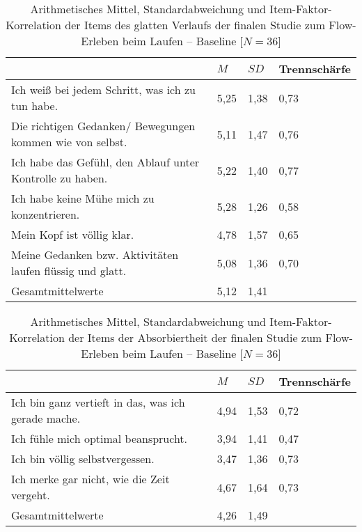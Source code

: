 \begin{table}[ht]
\centering
	\caption[Item-Faktor-Korrelation der Items des glatten Verlaufs -- Baseline (Studie: Laufen)]{Arithmetisches Mittel, Standardabweichung und Item-Faktor-Korrelation der Items des glatten Verlaufs der finalen Studie zum Flow-Erleben beim Laufen -- Baseline [$N = 36$]}
	\label{tab:glatter_verlauf_studie_laufen_baseline}
	\begin{tabularx}{\textwidth}{p{} p{} p{} p{}}
\toprule
& $M$ & $SD$ & Trennschärfe \\
\midrule
Ich weiß bei jedem Schritt, was ich zu tun habe. & 5,25 & 1,38 & 0,73 \\
Die richtigen Gedanken/ Bewegungen kommen wie von selbst. & 5,11 & 1,47 & 0,76 \\
Ich habe das Gefühl, den Ablauf unter Kontrolle zu haben. & 5,22 & 1,40 & 0,77 \\
Ich habe keine Mühe mich zu konzentrieren. & 5,28 & 1,26 & 0,58 \\
Mein Kopf ist völlig klar. & 4,78 & 1,57 & 0,65 \\
Meine Gedanken bzw. Aktivitäten laufen flüssig und glatt. & 5,08 & 1,36 & 0,70 \\
Gesamtmittelwerte & 5,12 & 1,41 & \\
\bottomrule
\end{tabularx}
\end{table}

\begin{table}[ht]
\centering
	\caption[Item-Faktor-Korrelation der Items der Absorbiertheit -- Baseline (Studie: Laufen)]{Arithmetisches Mittel, Standardabweichung und Item-Faktor-Korrelation der Items der Absorbiertheit der finalen Studie zum Flow-Erleben beim Laufen -- Baseline [$N = 36$]}
	\label{tab:absorbiertheit_studie_laufen_baseline}
	\begin{tabularx}{\textwidth}{p{} p{} p{} p{}}
\toprule
& $M$ & $SD$ & Trennschärfe \\
\midrule
Ich bin ganz vertieft in das, was ich gerade mache. & 4,94 & 1,53 & 0,72 \\
Ich fühle mich optimal beansprucht. & 3,94 & 1,41 & 0,47 \\
Ich bin völlig selbstvergessen. & 3,47 & 1,36 & 0,73 \\
Ich merke gar nicht, wie die Zeit vergeht. & 4,67 & 1,64 & 0,73 \\
Gesamtmittelwerte & 4,26 & 1,49 & \\
\bottomrule
\end{tabularx}
\end{table}

